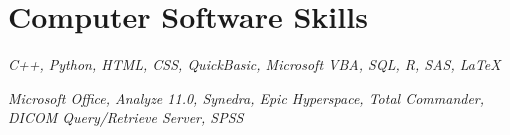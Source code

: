 \documentclass[10pt]{article} %
\begin{document}
\section{Computer Software Skills}

{
\textit{C++, Python, HTML, CSS, QuickBasic, Microsoft VBA, SQL, R, SAS, LaTeX}\\
}


{
\textit{Microsoft Office, Analyze 11.0, Synedra, Epic Hyperspace, Total Commander, DICOM Query/Retrieve Server, SPSS}\\
}

\end{document}
